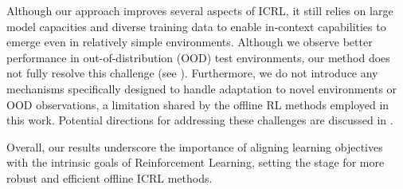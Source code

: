 \documentclass{article} %
\begin{document}
Although our approach improves several aspects of ICRL, it still relies on large model capacities and diverse training data to enable in-context capabilities to emerge even in relatively simple environments. Although we observe better performance in out-of-distribution (OOD) test environments, our method does not fully resolve this challenge (see ). Furthermore, we do not introduce any mechanisms specifically designed to handle adaptation to novel environments or OOD observations, a limitation shared by the offline RL methods employed in this work. Potential directions for addressing these challenges are discussed in .

Overall, our results underscore the importance of aligning learning objectives with the intrinsic goals of Reinforcement Learning, setting the stage for more robust and efficient offline ICRL methods.
\FloatBarrier




\newpage


\end{document}
